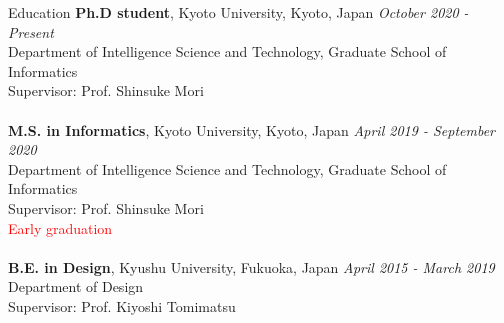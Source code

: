 \begin{rSection}{Education}
{\bf Ph.D student}, Kyoto University, Kyoto, Japan \hfill {\em October 2020 - Present}
\\ Department of Intelligence Science and Technology, Graduate School of Informatics
\\Supervisor: Prof. Shinsuke Mori\\
\\{\bf M.S. in Informatics}, Kyoto University, Kyoto, Japan \hfill {\em April 2019 - September 2020} 
\\ Department of Intelligence Science and Technology, Graduate School of Informatics
\\ Supervisor: Prof. Shinsuke Mori\\
\textcolor{red}{Early graduation}\\
\\{\bf B.E. in Design}, Kyushu University, Fukuoka, Japan \hfill {\em April 2015 - March 2019}
\\ Department of Design
\\ Supervisor: Prof. Kiyoshi Tomimatsu
\end{rSection}